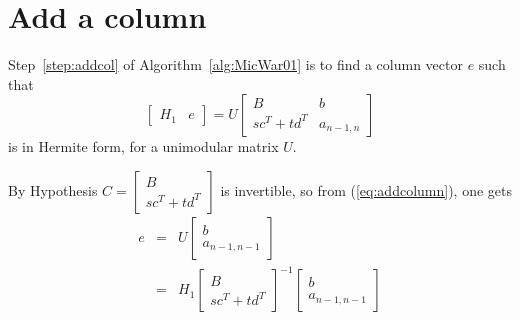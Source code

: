 \documentclass[preprint,12pt]{elsarticle}
\theoremstyle{plain}
\theoremstyle{definition}
\numberwithin{equation}{section}
\numberwithin{figure}{section}
\numberwithin{table}{section}
\begin{document}
\section{Add a column}\label{sec:addcolumn}
\label{sec:addcol}
Step~\ref{step:addcol} of Algorithm~\ref{alg:MicWar01} is
to find a column vector $e$ such that
\begin{equation}\label{eq:addcolumn}
\begin{bmatrix}
  H_1 & e
\end{bmatrix}
=
U
\begin{bmatrix}
  B & b\\
sc^T+td^T& a_{n-1,n}
\end{bmatrix}
\end{equation}
is in Hermite form, for a unimodular matrix $U$.

By Hypothesis $C =   \begin{bmatrix}
    B\\sc^T+td^T
  \end{bmatrix}$ is invertible, so 
from (\ref{eq:addcolumn}), one gets
\begin{eqnarray*}
  e &=& U
  \begin{bmatrix}
    b\\a_{n-1,n-1}
  \end{bmatrix}\\
  &=& H_1 
  \begin{bmatrix}
    B\\sc^T+td^T
  \end{bmatrix}^{-1}
  \begin{bmatrix}
    b\\a_{n-1,n-1}
  \end{bmatrix}\\
\end{eqnarray*}
\end{document}
